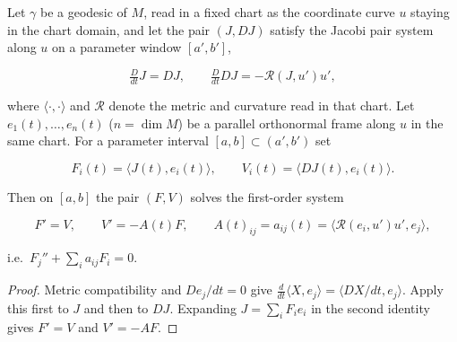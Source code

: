 \begin{lemma}
  \label{lem:dc-ch8-2-1-frame-coeff-bridge}
  \leanok
  Let $\gamma$ be a geodesic of $M$, read in a fixed chart as the coordinate curve $u$
  staying in the chart domain, and let the pair $(J,DJ)$ satisfy the Jacobi pair system
  along $u$ on a parameter window $[a',b']$,

  $$
  \tfrac{D}{dt}J=DJ,\qquad \tfrac{D}{dt}DJ=-\mathcal R(J,u')u' ,
  $$

  where $\langle\cdot,\cdot\rangle$ and $\mathcal R$ denote the metric and curvature read in
  that chart. Let $e_1(t),\dots,e_n(t)$ ($n=\dim M$) be a parallel orthonormal frame along
  $u$ in the same chart. For a parameter interval $[a,b]\subset(a',b')$ set

  $$
  F_i(t)=\langle J(t),e_i(t)\rangle,\qquad V_i(t)=\langle DJ(t),e_i(t)\rangle .
  $$

  Then on $[a,b]$ the pair $(F,V)$ solves the first-order system

  $$
  F'=V,\qquad V'=-A(t)F,\qquad A(t)_{ij}=a_{ij}(t)=\langle\mathcal R(e_i,u')u',e_j\rangle ,
  $$

  i.e.\ $F_j''+\sum_i a_{ij}F_i=0$.
\end{lemma}
\begin{proof}
  \leanok
\sketch
  Metric compatibility and $De_j/dt=0$ give
  $\frac d{dt}\langle X,e_j\rangle=\langle DX/dt,e_j\rangle$.
  Apply this first to $J$ and then to $DJ$. Expanding $J=\sum_iF_ie_i$ in the
  second identity gives $F'=V$ and $V'=-AF$.
\end{proof}


